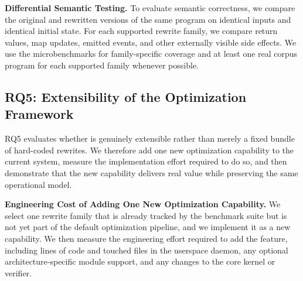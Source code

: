 
\noindent\textbf{Differential Semantic Testing.}
To evaluate semantic correctness, we compare the original and rewritten versions of the same program on identical inputs and identical initial state. For each supported rewrite family, we compare return values, map updates, emitted events, and other externally visible side effects. We use the microbenchmarks for family-specific coverage and at least one real corpus program for each supported family whenever possible.


\subsection{RQ5: Extensibility of the Optimization Framework}
\label{subsec:rq5}

RQ5 evaluates whether \tool is genuinely extensible rather than merely a fixed bundle of hard-coded rewrites. We therefore add one new optimization capability to the current system, measure the implementation effort required to do so, and then demonstrate that the new capability delivers real value while preserving the same operational model.

\noindent\textbf{Engineering Cost of Adding One New Optimization Capability.}
We select one rewrite family that is already tracked by the benchmark suite but is not yet part of the default optimization pipeline, and we implement it as a new \tool capability. We then measure the engineering effort required to add the feature, including lines of code and touched files in the userspace daemon, any optional architecture-specific module support, and any changes to the core kernel or verifier.


